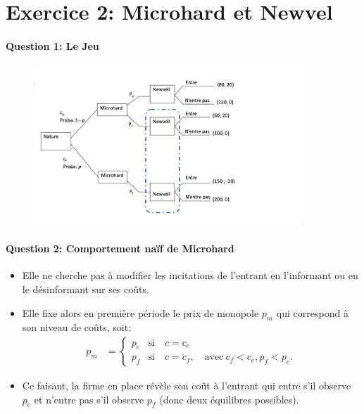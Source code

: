 \section{Exercice 2: Microhard et Newvel}
\frame{\sectionpage}

\begin{frame}
  [allowframebreaks]{\insertsection}
  \framesubtitle{Question 1: Le Jeu}
\begin{figure}
  \begin{center}
  \includegraphics[width=4in]{Arbreq1figAlexis.png}
\end{center}
\end{figure}
\end{frame}  
\begin{frame}
[allowframebreaks]{\insertsection}
\framesubtitle{Question 2: Comportement naïf de Microhard}
\begin{itemize}
  \item Elle ne cherche pas à modifier les incitations de l’entrant en l’informant ou en le désinformant sur ses coûts.
  \item Elle fixe alors en première période le prix de monopole $p_m$
   qui correspond à son niveau 
  de coûts, soit:
  \begin{align*}
    p_m &=\left\{
    \begin{array}{ll}
     p_e &\text{si} \quad c = c_e\\
     p_f &\text{si} \quad c = c_f, \quad \text{avec} \ c_f < c_e, p_f < p_e.
    \end{array}
    \right.
  \end{align*}
  \item Ce faisant, la firme en place révèle son coût à l’entrant qui entre s’il
   observe $p_e$ et n’entre pas s’il observe $p_f$ (donc deux équilibres possibles).
\end{itemize}
\end{frame}  
